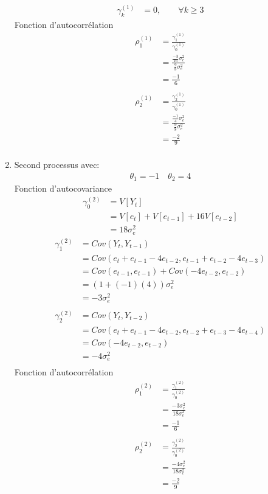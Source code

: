 \documentclass{article}
\begin{document}
\begin{enumerate}
\begin{align*}
\end{align*}
\begin{align*}
\gamma_k^{(1)} &= 0, \qquad \forall k \geq 3
\end{align*}
Fonction d'autocorrélation
\begin{align*}
\rho_1^{(1)} &= \frac{\gamma_1^{(1)}}{\gamma_0^{(1)}} \\
&= \frac{\frac{-3}{16}\sigma^2_e}{\frac{9}{8}\sigma^2_e} \\
&= \frac{-1}{6} \\
\end{align*}
\begin{align*}
\rho_2^{(1)} &= \frac{\gamma_2^{(1)}}{\gamma_0^{(1)}} \\
&= \frac{\frac{-1}{4}\sigma^2_e}{\frac{9}{8}\sigma^2_e} \\
&= \frac{-2}{9} \\
\end{align*}
\item Second processus avec:
\begin{align*}
\theta_1 = -1 \quad \theta_2 = 4
\end{align*}
Fonction d'autocovariance
\begin{align*}
\gamma_0^{(2)} &= V[Y_t] \\
&= V[e_t]+V[e_{t-1}]+16V[e_{t-2}] \\
&= 18 \sigma^2_e
\end{align*}
\begin{align*}
\gamma_1^{(2)} &= Cov(Y_t,Y_{t-1}) \\
&= Cov(e_t + e_{t-1} - 4e_{t-2}, e_{t-1} + e_{t-2} - 4e_{t-3}) \\
&= Cov(e_{t-1},e_{t-1}) + Cov(-4e_{t-2},e_{t-2}) \\
&= (1 + (-1)(4))\sigma^2_e \\
&= -3\sigma^2_e \\
\end{align*}
\begin{align*}
\gamma_2^{(2)} &= Cov(Y_t,Y_{t-2}) \\
&= Cov(e_t + e_{t-1} - 4e_{t-2}, e_{t-2} + e_{t-3} - 4e_{t-4} )\\
&= Cov(- 4e_{t-2},e_{t-2}) \\
&= -4\sigma^2_e \\
\end{align*}
Fonction d'autocorrélation
\begin{align*}
\rho_1^{(2)} &= \frac{\gamma_1^{(2)}}{\gamma_0^{(2)}} \\
&= \frac{-3\sigma^2_e}{18\sigma^2_e} \\
&= \frac{-1}{6} \\
\end{align*}
\begin{align*}
\rho_2^{(2)} &= \frac{\gamma_2^{(2)}}{\gamma_0^{(2)}} \\
&= \frac{-4\sigma^2_e}{18\sigma^2_e} \\
&= \frac{-2}{9} \\
\end{align*}
\end{enumerate}
\end{document}
